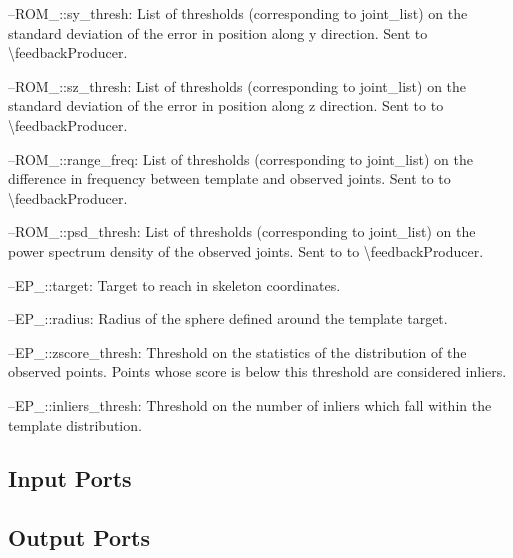 \begin{DoxyItemize}
\item --R\+O\+M\+\_\+::sy\+\_\+thresh\+: List of thresholds (corresponding to joint\+\_\+list) on the standard deviation of the error in position along y direction. Sent to \textbackslash{}feedback\+Producer.
\item --R\+O\+M\+\_\+::sz\+\_\+thresh\+: List of thresholds (corresponding to joint\+\_\+list) on the standard deviation of the error in position along z direction. Sent to to \textbackslash{}feedback\+Producer.
\item --R\+O\+M\+\_\+::range\+\_\+freq\+: List of thresholds (corresponding to joint\+\_\+list) on the difference in frequency between template and observed joints. Sent to to \textbackslash{}feedback\+Producer.
\item --R\+O\+M\+\_\+::psd\+\_\+thresh\+: List of thresholds (corresponding to joint\+\_\+list) on the power spectrum density of the observed joints. Sent to to \textbackslash{}feedback\+Producer.
\item --E\+P\+\_\+::target\+: Target to reach in skeleton coordinates.
\item --E\+P\+\_\+::radius\+: Radius of the sphere defined around the template target.
\item --E\+P\+\_\+::zscore\+\_\+thresh\+: Threshold on the statistics of the distribution of the observed points. Points whose score is below this threshold are considered inliers.
\item --E\+P\+\_\+::inliers\+\_\+thresh\+: Threshold on the number of inliers which fall within the template distribution. 
\end{DoxyItemize}\hypertarget{group__skeletonViewer_inputports_sec}{}\subsection{Input Ports}\label{group__skeletonViewer_inputports_sec}
\hypertarget{group__skeletonViewer_outputports_sec}{}\subsection{Output Ports}\label{group__skeletonViewer_outputports_sec}

